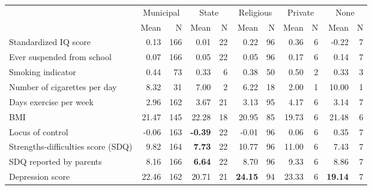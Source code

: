 \begin{tabular}{l r r r r r r r r r r}
\toprule
& \multicolumn{2}{c}{Municipal} & \multicolumn{2}{c}{State} & \multicolumn{2}{c}{Religious} & \multicolumn{2}{c}{Private} & \multicolumn{2}{c}{None} \\
& \scriptsize Mean & \scriptsize N & \scriptsize Mean & \scriptsize N & \scriptsize Mean & \scriptsize N & \scriptsize Mean & \scriptsize N & \scriptsize Mean & \scriptsize N \\
\midrule
Standardized IQ score &      0.13 &       166 &      0.01 &        22 &      0.22 &        96 &      0.36 &         6 &     -0.22 &         7 \\
Ever suspended from school &      0.07 &       166 &      0.05 &        22 &      0.05 &        96 &      0.17 &         6 &      0.14 &         7 \\
Smoking indicator &      0.44 &        73 &      0.33 &         6 &      0.38 &        50 &      0.50 &         2 &      0.33 &         3 \\
Number of cigarettes per day &      8.32 &        31 &      7.00 &         2 &      6.22 &        18 &      2.00 &         1 &     10.00 &         1 \\
Days exercise per week &      2.96 &       162 &      3.67 &        21 &      3.13 &        95 &      4.17 &         6 &      3.14 &         7 \\
BMI &     21.47 &       145 &     22.28 &        18 &     20.95 &        85 &     19.73 &         6 &     21.48 &         6 \\
Locus of control &     -0.06 &       163 & \textbf{    -0.39} &        22 &     -0.01 &        96 &      0.06 &         6 &      0.35 &         7 \\
Strengths-difficulties score (SDQ) &      9.82 &       164 & \textbf{     7.73} &        22 &     10.77 &        96 &     11.00 &         6 &      7.43 &         7 \\
SDQ reported by parents &      8.16 &       166 & \textbf{     6.64} &        22 &      8.70 &        96 &      9.33 &         6 &      8.86 &         7 \\
Depression score &     22.46 &       162 &     20.71 &        21 & \textbf{    24.15} &        94 &     23.33 &         6 & \textbf{    19.14} &         7 \\
\bottomrule
\end{tabular}
